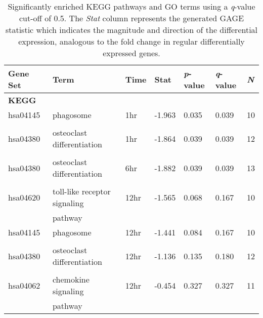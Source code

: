 \begin{table}
\centering
\caption{Significantly enriched KEGG pathways and GO terms using a \textit{q}-value cut-off of 0.5. The \textit{Stat} column represents the generated GAGE statistic which indicates the magnitude and direction of the differential expression, analogous to the fold change in regular differentially expressed genes.}
\label{tab:gage}
\begin{tabular}{lllllll}
 \toprule
     \textbf{Gene Set} & \textbf{Term}                          & \textbf{Time} & \textbf{Stat}   & \textbf{\textit{p}-value} & \textbf{\textit{q}-value} & \textbf{\textit{N}}   \\ \midrule
            \textbf{KEGG}   \\ \midrule
hsa04145~ & phagosome                     & 1hr  & -1.963 & 0.035   & 0.039   & 10  \\
          &                               &      &        &         &         &     \\ \hline
hsa04380~ & osteoclast differentiation    & 1hr  & -1.864 & 0.039   & 0.039   & 12  \\
          &                               &      &        &         &         &     \\ \hline
hsa04380~ & osteoclast differentiation    & 6hr  & -1.882 & 0.039   & 0.039   & 13  \\
          &                               &      &        &         &         &     \\ \hline
hsa04620~ & toll-like receptor signaling~ & 12hr & -1.565 & 0.068   & 0.167   & 10  \\
          & pathway                       &      &        &         &         &     \\ \hline
hsa04145~ & phagosome                     & 12hr & -1.441 & 0.084   & 0.167   & 10  \\
          &                               &      &        &         &         &     \\ \hline
hsa04380~ & osteoclast differentiation    & 12hr & -1.136 & 0.135   & 0.180   & 12  \\
          &                               &      &        &         &         &     \\ \hline
hsa04062~ & chemokine signaling~          & 12hr & -0.454 & 0.327   & 0.327   & 11  \\
          & pathway                       &      &        &         &         &    \\ \midrule


\end{tabular}
\end{table}

